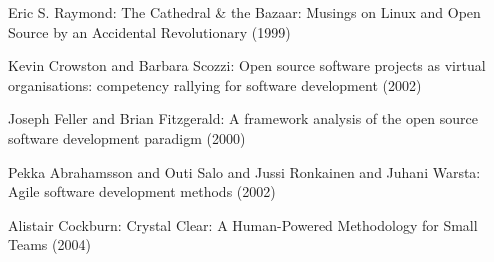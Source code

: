 \documentclass[lnbip]{svmultln}
\begin{document}
\begin{thebibliography}{5}
 Eric S. Raymond: The Cathedral \& the Bazaar:
  Musings on {Linux} and Open Source by an Accidental Revolutionary
  (1999)

 Kevin Crowston and Barbara Scozzi: Open source
  software projects as virtual organisations: competency rallying for
  software development (2002)

 Joseph Feller and Brian Fitzgerald: A
  framework analysis of the open source software development paradigm
  (2000)

 Pekka Abrahamsson and Outi Salo and Jussi
  Ronkainen and Juhani Warsta: Agile software development methods
  (2002)

 Alistair Cockburn: Crystal Clear: A
  Human-Powered Methodology for Small Teams (2004)












\end{thebibliography}
\end{document}

